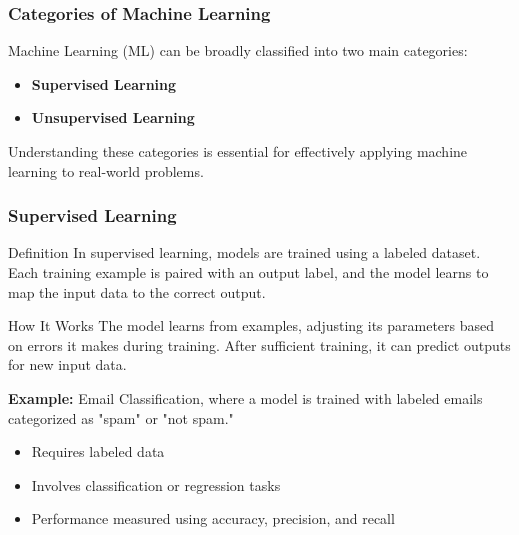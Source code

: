 \documentclass[aspectratio=169]{beamer}
\begin{document}
\begin{frame}[fragile]
    \frametitle{Categories of Machine Learning}
    Machine Learning (ML) can be broadly classified into two main categories: 
    \begin{itemize}
        \item \textbf{Supervised Learning}
        \item \textbf{Unsupervised Learning}
    \end{itemize}
    Understanding these categories is essential for effectively applying machine learning to real-world problems.
\end{frame}

\begin{frame}[fragile]
    \frametitle{Supervised Learning}
    \begin{block}{Definition}
        In supervised learning, models are trained using a labeled dataset. Each training example is paired with an output label, and the model learns to map the input data to the correct output.
    \end{block}
    
    \begin{block}{How It Works}
        The model learns from examples, adjusting its parameters based on errors it makes during training. After sufficient training, it can predict outputs for new input data.
    \end{block}

    \begin{example}
        \textbf{Example:} 
        Email Classification, where a model is trained with labeled emails categorized as "spam" or "not spam."
    \end{example}

    \begin{itemize}
        \item Requires labeled data
        \item Involves classification or regression tasks
        \item Performance measured using accuracy, precision, and recall
    \end{itemize}
\end{frame}
\end{document}
